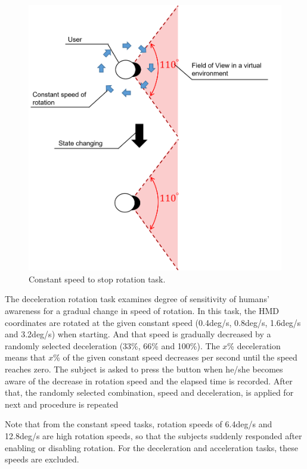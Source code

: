 \begin{figure}[H]\centering
	\includegraphics[width=1.0\textwidth]{Pictures/ConstantToStop.png}%
	\caption{Constant speed to stop rotation task.}\label{fig:Constant Speed to Stop Rotation task task}%
\end{figure}
\newpage


The deceleration rotation task examines degree of sensitivity of humans' awareness for a gradual change in speed of rotation. In this task, the HMD coordinates are rotated at the given constant speed (0.4deg/s, 0.8deg/s, 1.6deg/s and 3.2deg/s) when starting. And that speed is gradually decreased by a randomly selected deceleration (33\%, 66\% and 100\%). The $x$\% deceleration means that $x$\% of the given constant speed decreases per second until the speed reaches zero. The subject is asked to press the button when he/she becomes aware of the decrease in rotation speed and the elapsed time is recorded. After that, the randomly selected combination, speed and deceleration, is applied for next and procedure is repeated

Note that from the constant speed tasks, rotation speeds of 6.4deg/s and 12.8deg/s are high rotation speeds, so that the subjects suddenly responded after enabling or disabling rotation. For the deceleration and acceleration tasks, these speeds are excluded.

